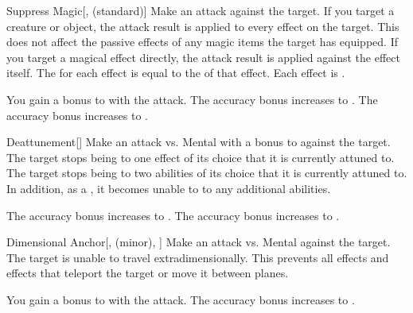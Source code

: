 \lowercase{\hypertarget{spell:Suppress Magic}{}}\label{spell:Suppress Magic}
\begin{freeability}[Rank 1]{\hypertarget{spell:Suppress Magic}{Suppress Magic}}[,  (standard)]
Make an attack against the target.
If you target a creature or object, the attack result is applied to every  effect on the target.
This does not affect the passive effects of any magic items the target has equipped.
If you target a magical effect directly, the attack result is applied against the effect itself.
The  for each effect is equal to the  of that effect.
\hit Each effect is .

\rankline
{} You gain a  bonus to  with the attack.
 The accuracy bonus increases to .
 The accuracy bonus increases to .
\end{freeability}
\vspace{0.25em}



\lowercase{\hypertarget{spell:Deattunement}{}}\label{spell:Deattunement}
\begin{freeability}[Rank 3]{\hypertarget{spell:Deattunement}{Deattunement}}[]
Make an attack vs. Mental with a  bonus to  against the target.
\hit The target stops being  to one effect of its choice that it is currently attuned to.
\crit The target stops being  to two abilities of its choice that it is currently attuned to.
In addition, as a , it becomes unable to  to any additional abilities.

\rankline
{} The accuracy bonus increases to .
 The accuracy bonus increases to .
\end{freeability}
\vspace{0.25em}



\lowercase{\hypertarget{spell:Dimensional Anchor}{}}\label{spell:Dimensional Anchor}
\begin{freeability}[Rank 3]{\hypertarget{spell:Dimensional Anchor}{Dimensional Anchor}}[,  (minor), ]
Make an attack vs. Mental against the target.
\hit The target is unable to travel extradimensionally.
This prevents all  effects and effects that teleport the target or move it between planes.

\rankline
{} You gain a  bonus to  with the attack.
 The accuracy bonus increases to .
\end{freeability}
\vspace{0.25em}



